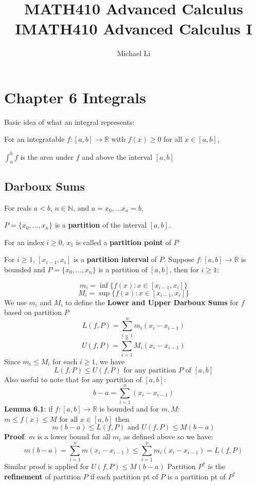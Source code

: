 \documentclass{article}
\date{}
\title{MATH410 Advanced Calculus I}
\begin{document}
 
  \author{Michael Li}
  \title{MATH410 Advanced Calculus I}
  \maketitle
  \tableofcontents
  \newpage
  \section{Chapter 6 Integrals}
  Basic idea of what an integral represents:

  For an integratable $f \colon [a,b] \rightarrow \mathbb{R}$ with $f(x) \geq 0$ for all $x \in [a, b]$,
  
  $\int_a^bf$ is the area under $f$ and above the interval $[a, b]$
  \subsection{Darboux Sums}
  For reals $a < b$, $n \in \mathbb{N}$, and $a=x_0, \ldots x_{n} = b$,

  $P = \{x_0, \ldots, x_n\}$ is a \textbf{partition} of the interval $[a, b]$.

  For an index $i \geq 0$, $x_1$ is called a \textbf{partition point} of $P$

  For $i \geq 1$, $[x_{i-1}, x_i]$ is a \textbf{partition interval} of $P$.
  \newline \newline
  Suppose $f \colon [a, b] \rightarrow \mathbb{R}$ is bounded and $P = \{x_0, \ldots, x_n\}$ is a partition of $[a, b]$, then for $i \geq 1$:

  \[m_i = \inf\{f(x) \colon x \in [x_{i-1}, x_i]\}\]
  \[M_i = \sup\{f(x) \colon x \in [x_{i-1}, x_i]\}\]
  We use $m_i$ and $M_i$ to define the \textbf{Lower and Upper Darboux Sums} for $f$ based on partition $P$
  \[L(f, P) = \sum_{i = 1}^{n}m_i(x_i - x_{i-1})\]
  \[U(f, P) = \sum_{i = 1}^{n}M_i(x_i - x_{i-1})\]
  Since $m_i \leq M_i$ for each $i \geq 1$, we have
  \[L(f, P) \leq U(f, P) \text{ for any partition } P \text{ of } [a,b]\]
  Also useful to note that for any partition of $[a, b]$:
  \[b - a = \sum_{i = 1}^{n}(x_i - x_{i-1})\]
  \textbf{Lemma 6.1}: if $f \colon [a, b] \rightarrow \mathbb{R}$ is bounded and for $m, M$: $m \leq f(x) \leq M \text{ for all } x \in [a,b]$ then 
  \[m(b-a) \leq L(f, P) \text{ and } U(f, P) \leq M(b-a)\]
  \textbf{Proof}: $m$ is a lower bound for all $m_i$ as defined above so we have:
  \[m(b-a) = \sum_{i = 1}^{n}m(x_i-x_{i-1}) \leq \sum_{i=1}^{n}{m_i}(x_i-x_{i-1}) = L(f, P)\]
  Similar proof is applied for $U(f, P) \leq M(b-a)$ \newline \newline
  Partition $P^*$ is the \textbf{refinement} of partition $P$ if each partition pt of $P$ is a partition pt of $P^*$
\end{document}

